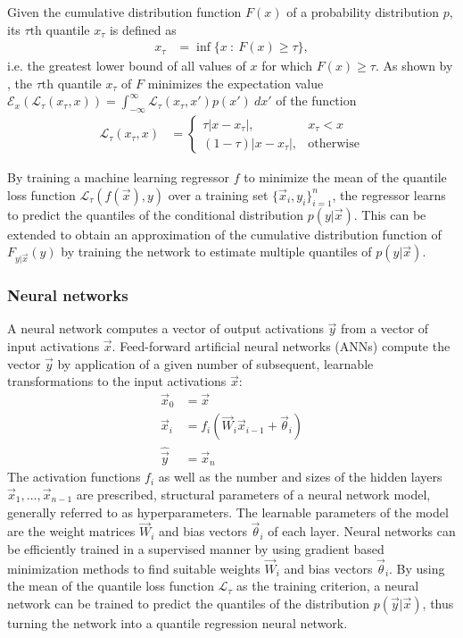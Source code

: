 \documentclass[journal abbreviation, manuscript]{copernicus}
\begin{document}
Given the cumulative distribution function $F(x)$ of a probability distribution
$p$, its $\tau\text{th}$ quantile $x_\tau$ is defined as
\begin{align}
x_\tau &= \inf \{x \: : \: F(x) \geq \tau \},
\end{align}
i.e. the greatest lower bound of all values of $x$ for which $F(x) \geq \tau$.
As shown by \citet{koenker}, the $\tau\text{th}$ quantile $x_\tau$ of $F$
minimizes the expectation value $\mathcal{E}_x\left ( \mathcal{L}_\tau(x_\tau, x) \right) = \int_{-\infty}^\infty \mathcal{L}_\tau(x_\tau, x') p(x') \: dx'$
of the function
\begin{align}\label{eq:quantile_loss}
  \mathcal{L}_{\tau}(x_\tau, x) &=
  \begin{cases}
    \tau |x - x_\tau|, & x_\tau < x \\
    (1 - \tau)|x - x_\tau|, &\text{otherwise}
    \end{cases}
\end{align}

By training a machine learning regressor $f$ to minimize the mean of the quantile loss
function $\mathcal{L}_\tau(f(\vec{x}), y)$ over a training set $\{\vec{x}_i,
y_i\}_{i = 1}^n$, the regressor learns to predict the quantiles of the
conditional distribution $p(y | \vec{x})$. This can be extended to obtain an
approximation of the cumulative distribution function of $F_{y | \vec{x}}(y)$ by
training the network to estimate multiple quantiles of $p(y | \vec{x})$.

\subsubsection{Neural networks}

A neural network computes a vector of output activations $\vec{y}$ from a vector
of input activations $\vec{x}$. Feed-forward artificial neural networks (ANNs)
compute the vector $\vec{y}$ by application of a given number of subsequent,
learnable transformations to the input activations $\vec{x}$:
\begin{align*}
    \vec{x}_0 &= \vec{x}\\
    \vec{x}_i &= f_{i}
    \left ( \vec{W}_{i} \vec{x}_{i - 1}+ \vec{\theta}_i \right ) \\
    \hat{\vec{y}} &= \vec{x}_{n}
\end{align*}
The activation functions $f_i$ as well as the number and sizes of the hidden
layers $\vec{x}_1, \ldots, \vec{x}_{n-1}$ are prescribed, structural parameters of a
neural network model, generally referred to as hyperparameters. The learnable
parameters of the model are the weight matrices $\vec{W}_i$ and bias vectors
$\vec{\theta}_i$ of each layer. Neural networks can be efficiently trained in
a supervised manner by using gradient based minimization methods to find
suitable weights $\vec{W}_i$ and bias vectors $\vec{\theta}_i$. By using the
mean of the quantile loss function $\mathcal{L}_\tau$ as the training criterion,
a neural network can be trained to predict the quantiles of the distribution
$p(\vec{y} | \vec{x})$, thus turning the network into a quantile regression
neural network.
\end{document}
